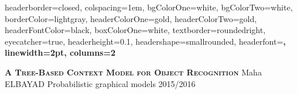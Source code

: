 \documentclass[portrait,a1paper,fontscale=0.5]{baposter} %
\begin{document}
\begin{poster}
{
headerborder=closed, %
colspacing=1em, %
bgColorOne=white, %
bgColorTwo=white, %
borderColor=lightgray, %
headerColorOne=gold, %
headerColorTwo=gold, %
headerFontColor=black, %
boxColorOne=white, %
textborder=roundedright, %
eyecatcher=true, %
headerheight=0.1\textheight, %
headershape=smallrounded, %
headerfont=\Large\bf\textsc, %
linewidth=2pt, %
columns=2
}
%

{\bf\scshape{A Tree-Based Context Model for Object Recognition}\vspace{0.5em}} %
{{Maha ELBAYAD  \hspace{50pt} Probabilistic graphical models 2015/2016}} %

\vspace{-10pt}
\end{poster}
\end{document}
